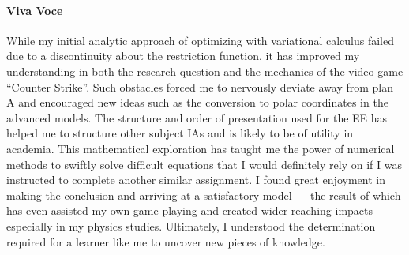 \documentclass[a4paper,12pt]{article}
\begin{document}
\paragraph{Viva Voce}
While my initial analytic approach of optimizing with variational calculus failed due to a discontinuity about the restriction function, it has improved my understanding in both the research question and the mechanics of the video game ``Counter Strike''. Such obstacles forced me to nervously deviate away from plan A and encouraged new ideas such as the conversion to polar coordinates in the advanced models. The structure and order of presentation used for the EE has helped me to structure other subject IAs and is likely to be of utility in academia. This mathematical exploration has taught me the power of numerical methods to swiftly solve difficult equations that I would definitely rely on if I was instructed to complete another similar assignment. I found great enjoyment in making the conclusion and arriving at a satisfactory model --- the result of which has even assisted my own game-playing and created wider-reaching impacts especially in my physics studies. Ultimately, I understood the determination required for a learner like me to uncover new pieces of knowledge.
\end{document}
